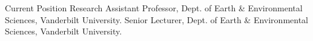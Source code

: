 %
%
\begin{rubric}{Current Position}
\entry* Research Assistant Professor, Dept. of Earth \& Environmental Sciences, Vanderbilt University.
\entry* Senior Lecturer, Dept. of Earth \& Environmental Sciences, Vanderbilt University.
\end{rubric}
